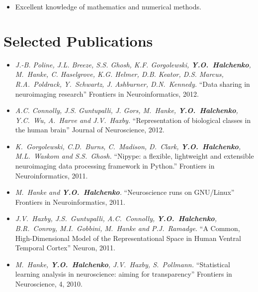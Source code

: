 \documentclass[12pt,overlapped,line]{res}
\newcommand{\mtitle}[1]{``#1''}
\newcommand{\mauthors}[1]{ \textit{#1.}}
\newcommand{\mwhere}[1]{#1.}
\begin{document}
\begin{resume}
\begin{description}[parsep=0.2em,leftmargin=1em]
\begin{itemize}
      \item Excellent knowledge of mathematics and numerical methods.

      \end{itemize}

  \end{description}

 \section{Selected Publications}

 \begin{itemize}

 \item
   \mauthors{J.-B. Poline, J.L. Breeze, S.S. Ghosh, K.F. Gorgolewski,
     \textbf{Y.O.~Halchenko}, M.~Hanke, C. Haselgrove, K.G. Helmer,
     D.B. Keator, D.S. Marcus, R.A.~Poldrack, Y.~Schwartz,
     J. Ashburner,  D.N.~Kennedy}
   \mtitle{Data sharing in neuroimaging research}
   \mwhere{Frontiers in Neuroinformatics, 2012}

 \item
   \mauthors{A.C.  Connolly, J.S.  Guntupalli, J. Gors, M.~Hanke,
     \textbf{Y.O.~Halchenko}, Y.C.~Wu, A.~Harve and J.V.~Haxby}
   \mtitle{Representation of biological classes in the human brain}
   \mwhere{Journal of Neuroscience, 2012}

 \item
   \mauthors{K.~Gorgolewski, C.D.~Burns, C.~Madison, D.~Clark, \textbf{Y.O.~Halchenko},
     M.L.~Waskom and S.S.~Ghosh}
   \mtitle{Nipype: a flexible, lightweight and extensible neuroimaging data processing framework in Python.}
   \mwhere{Frontiers in Neuroinformatics, 2011}


 \item
   \mauthors{M.~Hanke and \textbf{Y.O.~Halchenko}}
   \mtitle{Neuroscience runs on {GNU/Linux}}
   \mwhere{Frontiers in Neuroinformatics, 2011}

 \item
   \mauthors{J.V.~Haxby, J.S.~Guntupalli, A.C.~Connolly,
     \textbf{Y.O.~Halchenko}, B.R.~Conroy, M.I.~Gobbini, M.~Hanke and
     P.J.~Ramadge}
   \mtitle{A Common, High-Dimensional Model of the Representational
     Space in Human Ventral Temporal Cortex}
   \mwhere{Neuron, 2011}

 \item
   \mauthors{M.~Hanke, \textbf{Y.O.~Halchenko}, J.V.~Haxby, S.~Pollmann}
   \mtitle{Statistical learning analysis in neuroscience: aiming for
     transparency}
   \mwhere{Frontiers in Neuroscience, 4, 2010}


\end{itemize}
\end{resume}
\end{document}
